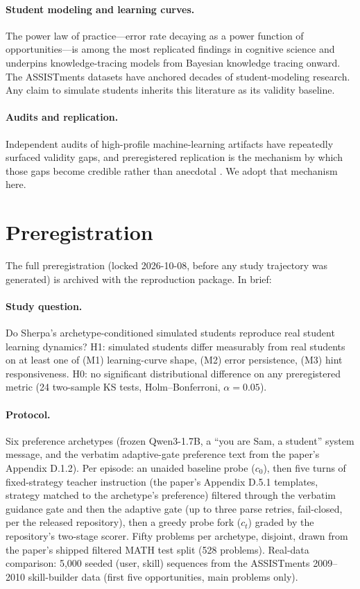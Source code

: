 \documentclass[12pt,a4paper]{article}
\begin{document}
\paragraph{Student modeling and learning curves.} The power law of
practice---error rate decaying as a power function of opportunities---is
among the most replicated findings in cognitive science \citep{newell1981}
and underpins knowledge-tracing models from Bayesian knowledge tracing
\citep{corbett1994} onward. The ASSISTments datasets \citep{feng2009} have
anchored decades of student-modeling research. Any claim to simulate
students inherits this literature as its validity baseline.

\paragraph{Audits and replication.} Independent audits of high-profile
machine-learning artifacts have repeatedly surfaced validity gaps, and
preregistered replication is the mechanism by which those gaps become
credible rather than anecdotal \citep{nosek2018}. We adopt that mechanism
here.

\section{Preregistration}
\label{sec:prereg}

The full preregistration (locked 2026-10-08, before any study trajectory was
generated) is archived with the reproduction package. In brief:

\paragraph{Study question.} Do Sherpa's archetype-conditioned simulated
students reproduce real student learning dynamics? H1: simulated students
differ measurably from real students on at least one of (M1) learning-curve
shape, (M2) error persistence, (M3) hint responsiveness. H0: no significant
distributional difference on any preregistered metric (24 two-sample KS
tests, Holm--Bonferroni, $\alpha=0.05$).

\paragraph{Protocol.} Six preference archetypes (frozen Qwen3-1.7B, a
``you are Sam, a student'' system message, and the verbatim adaptive-gate
preference text from the paper's Appendix D.1.2). Per episode: an unaided
baseline probe ($c_0$), then five turns of fixed-strategy teacher instruction
(the paper's Appendix D.5.1 templates, strategy matched to the archetype's
preference) filtered through the verbatim guidance gate and then the
adaptive gate (up to three parse retries, fail-closed, per the released
repository), then a greedy probe fork ($c_t$) graded by the repository's
two-stage scorer. Fifty problems per archetype, disjoint, drawn from the
paper's shipped filtered MATH test split (528 problems). Real-data
comparison: 5{,}000 seeded (user, skill) sequences from the ASSISTments
2009--2010 skill-builder data (first five opportunities, main problems
only).
\end{document}
